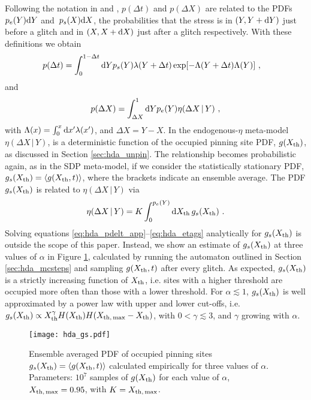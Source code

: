 \begin{subappendices}
Following the notation in \citet{Daly2007} and \citet{Fulgenzi2017}, $p(\Delta t)$ and $p(\Delta X)$ are related to the PDFs $p_e(Y)\textrm{d} Y$ and $\,p_s(X)\textrm{d} X$, the probabilities that the stress is in $(Y, Y+\textrm{d} Y)$ just before a glitch and in $(X, X+\textrm{d} X)$ just after a glitch respectively. With these definitions we obtain
\begin{align}
p(\Delta t) &= \int_0^{1 - \Delta t} \textrm{d} Y p_s(Y) \lambda(Y + \Delta t) \exp[-\Lambda(Y + \Delta t) \Lambda(Y)]\ , \label{eq:hda_pdelt_app}
\end{align}
and 
\begin{align}
p(\Delta X) = \int_{\Delta X}^{1} \textrm{d} Y p_e(Y) \eta(\Delta X\,|\,Y)\ , \label{eq:hda_pdelx_app}
\end{align}
with $\Lambda(x) = \int_0^x\textrm{d} x' \lambda(x')$, and $\Delta X = Y - X$. In the endogenous-$\eta$ meta-model $\eta(\Delta X\,|\,Y)$, is a deterministic function of the occupied pinning site PDF, $g(X_{\rm th})$, as discussed in Section \ref{sec:hda_unpin}. The relationship becomes probabilistic again, as in the SDP meta-model, if we consider the statistically stationary PDF, $g_s(X_{\rm th}) = \langle g(X_{\rm th}, t) \rangle$, where the brackets indicate an ensemble average. The PDF $g_s(X_{\rm th})$ is related to $\eta(\Delta X\,|\,Y)$ via 
\begin{align}
\eta(\Delta X\,|\,Y) = K \int_0^{p_e(Y)} \textrm{d} X_{\rm th}\, g_s(X_{\rm th})\ . \label{eq:hda_etags}
\end{align}
Solving equations \eqref{eq:hda_pdelt_app}--\eqref{eq:hda_etags} analytically for $g_s(X_{\rm th})$ is outside the scope of this paper. Instead, we show an estimate of $g_s(X_{\rm th})$ at three values of $\alpha$ in Figure \ref{fig:hda_gs}, calculated by running the automaton outlined in Section \ref{sec:hda_mcsteps} and sampling $g(X_{\rm th}, t)$ after every glitch. As expected, $g_s(X_{\rm th})$ is a strictly increasing function of $X_{\rm th}$, i.e. sites with a higher threshold are occupied more often than those with a lower threshold. For $\alpha \lesssim 1$, $g_s(X_{\rm th})$ is well approximated by a power law with upper and lower cut-offs, i.e. $g_s(X_{\rm th}) \propto X_{\rm th}^{\gamma}H(X_{\rm th})H(X_{\rm th,\,max} - X_{\rm th})$, with $0 < \gamma \lesssim 3$, and $\gamma$ growing with $\alpha$. 

\begin{figure}
\centering
\texttt{[image: hda\_gs.pdf]}
\caption{Ensemble averaged PDF of occupied pinning sites $g_s(X_{\rm th}) = \langle g(X_{\rm th}, t) \rangle$ calculated empirically for three values of $\alpha$. Parameters: $10^7$ samples of $g(X_{\rm th})$ for each value of $\alpha$, $X_{\rm th,\,max}=0.95$, with $K=X_{\rm th,\,max}$. \label{fig:hda_gs}}
\end{figure}


\end{subappendices}
